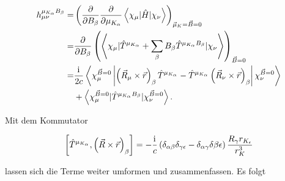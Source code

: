     \begin{equation}
    \begin{aligned}
    h_{\mu\nu}^{\mu_{K_\alpha}B_\beta}=&\left(\frac{\partial}{\partial B_\beta}\frac{\partial}{\partial \mu_{K_\alpha}}\left\langle\chi_\mu\vert\hat{H}\vert\chi_\nu \right\rangle\right)_{\vec{\mu}_K=\vec{B}=0}\\
    =&\frac{\partial}{\partial B_\beta}\left(\left\langle\chi_\mu\vert\hat{T}^{\mu_{K_\alpha}}+\sum_\beta B_\beta \hat{T}^{\mu_{K_\alpha}B_\beta}\vert\chi_\nu\right\rangle\right)_{\vec{B}=0}\\
    =&\frac{\mathrm{i}\mkern1mu}{2c}\left\langle\chi_\mu^{\vec{B}=0}\left\vert\left(\vec{R}_\mu\times\vec{r}\right)_\beta\hat{T}^{\mu_{K_\alpha}}-\hat{T}^{\mu_{K_\alpha}}\left(\vec{R}_\nu\times\vec{r}\right)_\beta\right\vert\chi_\nu^{\vec{B}=0}\right\rangle\\
    &+\left\langle\chi_\mu^{\vec{B}=0}\vert\hat{T}^{\mu_{K_\alpha}B_\beta}\vert\chi_\nu^{\vec{B}=0}\right\rangle.
    \end{aligned}
	\end{equation}     
      
    Mit dem Kommutator\supercite{baron1991}
    
    \begin{equation}
    \left[\hat{T}^{\mu_{K_\alpha}},\left(\vec{R}\times\vec{r}\right)_\beta\right]=-\frac{\mathrm{i}\mkern1mu}{c}\left(\delta_{\alpha\beta}\delta_{\gamma\epsilon}-\delta_{\alpha\gamma}\delta{\beta\epsilon}\right)\frac{R_\gamma r_{K_\epsilon}}{r_K^3}
    \end{equation}
    
    lassen sich die Terme weiter umformen und zusammenfassen. Es folgt
    
